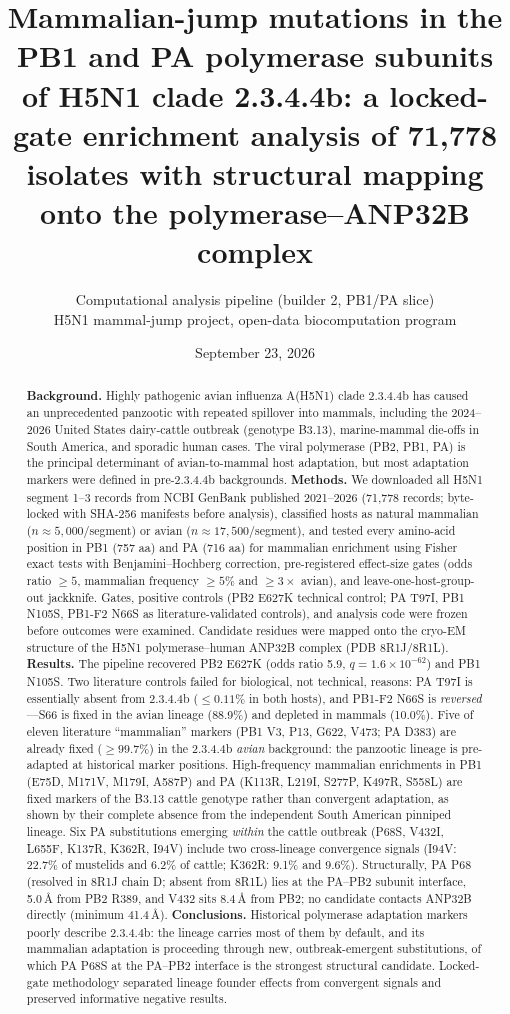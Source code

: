 \documentclass[11pt]{article}
\title{\textbf{Mammalian-jump mutations in the PB1 and PA polymerase subunits of H5N1 clade 2.3.4.4b: a locked-gate enrichment analysis of 71,778 isolates with structural mapping onto the polymerase--ANP32B complex}}
\author{Computational analysis pipeline (builder 2, PB1/PA slice)\\
H5N1 mammal-jump project, open-data biocomputation program}
\date{September 23, 2026}
\begin{document}
\maketitle
\begin{abstract}
\textbf{Background.} Highly pathogenic avian influenza A(H5N1) clade 2.3.4.4b has caused an unprecedented panzootic with repeated spillover into mammals, including the 2024--2026 United States dairy-cattle outbreak (genotype B3.13), marine-mammal die-offs in South America, and sporadic human cases. The viral polymerase (PB2, PB1, PA) is the principal determinant of avian-to-mammal host adaptation, but most adaptation markers were defined in pre-2.3.4.4b backgrounds.
\textbf{Methods.} We downloaded all H5N1 segment 1--3 records from NCBI GenBank published 2021--2026 (71,778 records; byte-locked with SHA-256 manifests before analysis), classified hosts as natural mammalian ($n\approx5,000$/segment) or avian ($n\approx17,500$/segment), and tested every amino-acid position in PB1 (757 aa) and PA (716 aa) for mammalian enrichment using Fisher exact tests with Benjamini--Hochberg correction, pre-registered effect-size gates (odds ratio $\geq5$, mammalian frequency $\geq5\%$ and $\geq3\times$ avian), and leave-one-host-group-out jackknife. Gates, positive controls (PB2 E627K technical control; PA T97I, PB1 N105S, PB1-F2 N66S as literature-validated controls), and analysis code were frozen before outcomes were examined. Candidate residues were mapped onto the cryo-EM structure of the H5N1 polymerase--human ANP32B complex (PDB 8R1J/8R1L).
\textbf{Results.} The pipeline recovered PB2 E627K (odds ratio 5.9, $q=1.6\times10^{-62}$) and PB1 N105S. Two literature controls failed for biological, not technical, reasons: PA T97I is essentially absent from 2.3.4.4b ($\leq0.11\%$ in both hosts), and PB1-F2 N66S is \emph{reversed}---S66 is fixed in the avian lineage (88.9\%) and depleted in mammals (10.0\%). Five of eleven literature ``mammalian'' markers (PB1 V3, P13, G622, V473; PA D383) are already fixed ($\geq99.7\%$) in the 2.3.4.4b \emph{avian} background: the panzootic lineage is pre-adapted at historical marker positions. High-frequency mammalian enrichments in PB1 (E75D, M171V, M179I, A587P) and PA (K113R, L219I, S277P, K497R, S558L) are fixed markers of the B3.13 cattle genotype rather than convergent adaptation, as shown by their complete absence from the independent South American pinniped lineage. Six PA substitutions emerging \emph{within} the cattle outbreak (P68S, V432I, L655F, K137R, K362R, I94V) include two cross-lineage convergence signals (I94V: 22.7\% of mustelids and 6.2\% of cattle; K362R: 9.1\% and 9.6\%). Structurally, PA P68 (resolved in 8R1J chain D; absent from 8R1L) lies at the PA--PB2 subunit interface, 5.0\,\AA{} from PB2 R389, and V432 sits 8.4\,\AA{} from PB2; no candidate contacts ANP32B directly (minimum 41.4\,\AA{}).
\textbf{Conclusions.} Historical polymerase adaptation markers poorly describe 2.3.4.4b: the lineage carries most of them by default, and its mammalian adaptation is proceeding through new, outbreak-emergent substitutions, of which PA P68S at the PA--PB2 interface is the strongest structural candidate. Locked-gate methodology separated lineage founder effects from convergent signals and preserved informative negative results.
\end{abstract}
\end{document}
